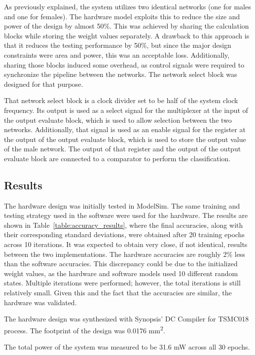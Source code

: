 \documentclass[10pt,journal]{IEEEtran}
\newcommand{\tbl}[1]{Table~\ref{#1}}
\begin{document}
			As previously explained, the system utilizes two identical networks (one for males and one for females). The hardware model exploits this to reduce the size and power of the design by almost 50\%. This was achieved by sharing the calculation blocks while storing the weight values separately. A drawback to this approach is that it reduces the testing performance by 50\%, but since the major design constraints were area and power, this was an acceptable loss. Additionally, sharing those blocks induced some overhead, as control signals were required to synchronize the pipeline between the networks. The network select block was designed for that purpose.
			
			That network select block is a clock divider set to be half of the system clock frequency. Its output is used as a select signal for the multiplexer at the input of the output evaluate block, which is used to allow selection between the two networks. Additionally, that signal is used as an enable signal for the register at the output of the output evaluate block, which is used to store the output value of the male network. The output of that register and the output of the output evaluate block are connected to a comparator to perform the classification.
	
	\subsection{Results}
		The hardware design was initially tested in ModelSim. The same training and testing strategy used in the software were used for the hardware. The results are shown in \tbl{table:accuracy_results}, where the final accuracies, along with their corresponding standard deviations, were obtained after 20 training epochs across 10 iterations. It was expected to obtain very close, if not identical, results between the two implementations. The hardware accuracies are roughly 2\% less than the software accuracies. This discrepancy could be due to the initialized weight values, as the hardware and software models used 10 different random states. Multiple iterations were performed; however, the total iterations is still relatively small. Given this and the fact that the accuracies are similar, the hardware was validated.
		
		The hardware design was synthesized with Synopsis' DC Compiler for TSMC018 process. The footprint of the design was 0.0176 mm\textsuperscript{2}.
		
		The total power of the system was measured to be 31.6 mW across all 30 epochs.
		
\end{document}
